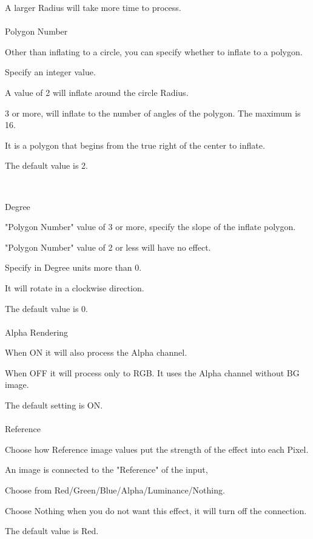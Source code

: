 \documentclass[a4paper,12pt]{article}
\begin{document}
A larger Radius will take more time to process.\\
\\
Polygon Number\par
Other than inflating to a circle, you can specify whether to inflate to a polygon.\par
Specify an integer value.\par
A value of 2 will inflate around the circle Radius.\par
3 or more, will inflate to the number of angles of the polygon. The maximum is 16.\par
It is a polygon that begins from the true right of the center to inflate.\par
The default value is 2.

\newpage

\thispagestyle{empty}

\ \vspace{-0.2em}
\\
\par
\noindent Degree\par
"Polygon Number" value of 3 or more, specify the slope of the inflate polygon.\par
"Polygon Number" value of 2 or less will have no effect.\par
Specify in Degree units more than 0.\par
It will rotate in a clockwise direction.\par
The default value is 0.\\
\\
Alpha Rendering\par
When ON it will also process the Alpha channel.\par
When OFF it will process only to RGB. It uses the Alpha channel without BG image.\par
The default setting is ON.\\
\\
Reference\par
Choose how Reference image values put the strength of the effect into each Pixel.\par
An image is connected to the "Reference" of the input,\par
Choose from Red/Green/Blue/Alpha/Luminance/Nothing.\par
Choose Nothing when you do not want this effect, it will turn off the connection.\par
The default value is Red.
\end{document}
